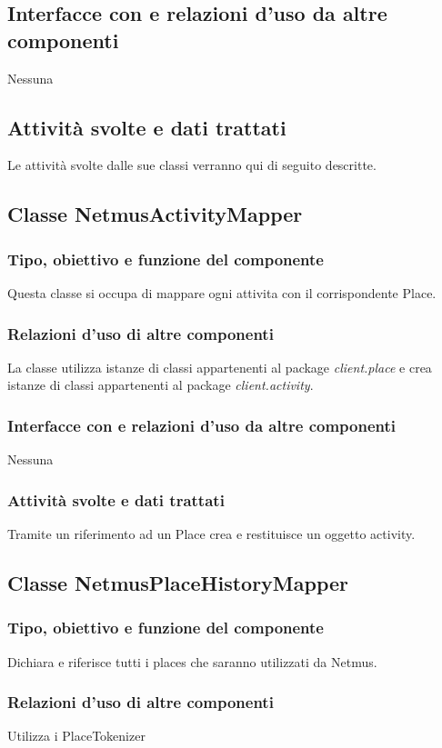 \subsection*{Interfacce con e relazioni d'uso da altre componenti}
Nessuna
\subsection*{Attivit\`a svolte e dati trattati}
Le attivit\`a svolte dalle sue classi verranno qui di seguito descritte.

\subsection{Classe NetmusActivityMapper}
\subsubsection*{Tipo, obiettivo e funzione del componente}
Questa classe si occupa di mappare ogni attivita con il corrispondente Place.
\subsubsection*{Relazioni d'uso di altre componenti}
La classe utilizza istanze di classi appartenenti al package
\emph{client.place} e crea istanze di classi appartenenti al package
\emph{client.activity}.
\subsubsection*{Interfacce con e relazioni d'uso da altre
componenti} Nessuna
\subsubsection*{Attivit\`a svolte e dati trattati}
Tramite un riferimento ad un Place crea e restituisce un oggetto activity.

\subsection{Classe NetmusPlaceHistoryMapper}
\subsubsection*{Tipo, obiettivo e funzione del componente}
Dichiara e riferisce tutti i places che saranno utilizzati da Netmus.
\subsubsection*{Relazioni d'uso di altre componenti}
Utilizza i PlaceTokenizer
